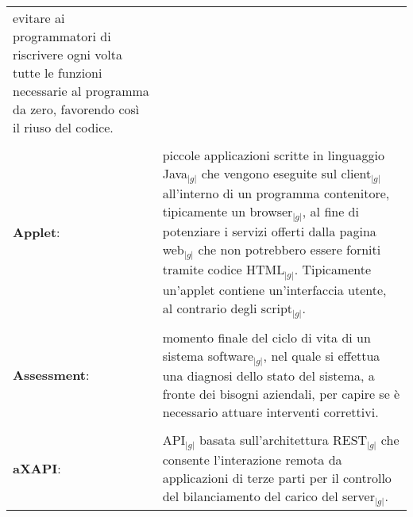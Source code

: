\begin{longtable}{p{} p{}}
						evitare ai programmatori di riscrivere ogni volta tutte le funzioni necessarie al programma da zero, favorendo così il riuso del codice. \\
	    \\
	    \textbf{Applet}:		&	piccole applicazioni scritte in linguaggio Java$_{|g|}$ che vengono eseguite sul client$_{|g|}$ all’interno di un programma contenitore, tipicamente un browser$_{|g|}$, al fine di potenziare i servizi offerti 
						dalla pagina web$_{|g|}$ che non potrebbero essere forniti tramite codice HTML$_{|g|}$. Tipicamente un’applet contiene un’interfaccia utente, al contrario degli script$_{|g|}$.\\
	    \\
	    \textbf{Assessment}:	&	momento finale del ciclo di vita di un sistema software$_{|g|}$, nel quale si effettua una diagnosi dello stato del sistema, a fronte dei bisogni aziendali,
						per capire se è necessario attuare interventi correttivi.\\
	    \\
	    \textbf{aXAPI}:		&	API$_{|g|}$ basata sull'architettura REST$_{|g|}$ che consente l'interazione remota da applicazioni di terze parti per il controllo del bilanciamento del carico del server$_{|g|}$.\\
	\end{longtable}
\newpage


